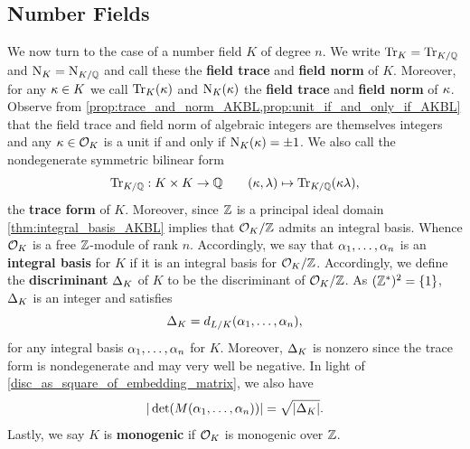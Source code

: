     \subsection*{Number Fields}
      We now turn to the case of a number field \(K\) of degree \(n\). We write \(\operatorname{\mathrm{Tr}}_{K} = \operatorname{\mathrm{Tr}}_{K/\mathbb{Q}}\) and \(\operatorname{\mathrm{N}}_{K} = \operatorname{\mathrm{N}}_{K/\mathbb{Q}}\) and call these the \textbf{field trace} and \textbf{field norm} of \(K\). Moreover, for any \(\kappa \in K\) we call \(\operatorname{\mathrm{Tr}}_{K}(\kappa)\) and \(\operatorname{\mathrm{N}}_{K}(\kappa)\) the \textbf{field trace} and \textbf{field norm} of \(\kappa\). Observe from \cref{prop:trace_and_norm_AKBL,prop:unit_if_and_only_if_AKBL} that the field trace and field norm of algebraic integers are themselves integers and any \(\kappa \in \mathcal{O}_{K}\) is a unit if and only if \(\operatorname{\mathrm{N}}_{K}(\kappa) = \pm 1\). We also call the nondegenerate symmetric bilinear form
      \[
        \operatorname{\mathrm{Tr}}_{K/\mathbb{Q}}:K \times K \to \mathbb{Q} \qquad (\kappa,\lambda) \mapsto \operatorname{\mathrm{Tr}}_{K/\mathbb{Q}}(\kappa\lambda),
      \]
      the \textbf{trace form} of \(K\). Moreover, since \(\mathbb{Z}\) is a principal ideal domain \cref{thm:integral_basis_AKBL} implies that \(\mathcal{O}_{K}/\mathbb{Z}\) admits an integral basis. Whence \(\mathcal{O}_{K}\) is a free \(\mathbb{Z}\)-module of rank \(n\). Accordingly, we say that \(\alpha_{1},\ldots,\alpha_{n}\) is an \textbf{integral basis} for \(K\) if it is an integral basis for \(\mathcal{O}_{K}/\mathbb{Z}\). Accordingly, we define the \textbf{discriminant} \(\Delta_{K}\) of \(K\) to be the discriminant of \(\mathcal{O}_{K}/\mathbb{Z}\). As \((\mathbb{Z}^{\ast})^{2} = \{1\}\), \(\Delta_{K}\) is an integer and satisfies
      \[
        \Delta_{K} = d_{L/K}(\alpha_{1},\ldots,\alpha_{n}),
      \]
      for any integral basis \(\alpha_{1},\ldots,\alpha_{n}\) for \(K\). Moreover, \(\Delta_{K}\) is nonzero since the trace form is nondegenerate and may very well be negative. In light of \cref{disc_as_square_of_embedding_matrix}, we also have
      \begin{equation}\label{equ:embedding_matrix_discriminant_relation}
        |\det(M(\alpha_{1},\ldots,\alpha_{n}))| = \sqrt{|\Delta_{K}|}.
      \end{equation}
      Lastly, we say \(K\) is \textbf{monogenic} if \(\mathcal{O}_{K}\) is monogenic over \(\mathbb{Z}\).
